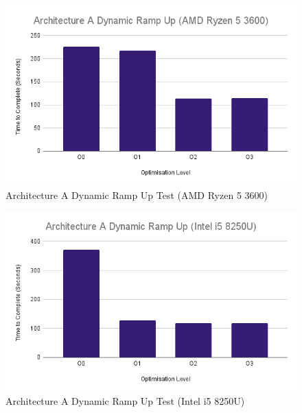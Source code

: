 \documentclass{article}
\begin{document}
\begin{figure}[!h]
\centering
\includegraphics[scale=0.5]{Architecture A Dynamic Ramp Up (AMD Ryzen 5 3600).png}
\caption{Architecture A Dynamic Ramp Up Test (AMD Ryzen 5 3600)}
\label{arch_a_dynamic_ramp_up_pc}
\end{figure}

\begin{figure}[!h]
\centering
\includegraphics[scale=0.5]{Architecture A Dynamic Ramp Up (Intel i5 8250U).png}
\caption{Architecture A Dynamic Ramp Up Test (Intel i5 8250U)}
\label{arch_a_dynamic_ramp_up_laptop}
\end{figure}

\clearpage
\end{document}
